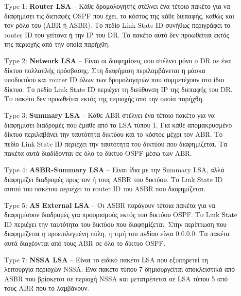 \documentclass{EdipyLabs} %
\begin{document}
\begin{itemize}
	\item [Type 1:] \textbf{Router LSA} -- Κάθε δρομολογητής στέλνει ένα τέτοιο πακέτο για να διαφημίσει τις διεπαφές OSPF που έχει, το κόστος της κάθε διεπαφής, καθώς και τον ρόλο του (ABR ή ASBR). Το πεδίο Link State ID συνήθως περιγράφει το router ID του γείτονα ή την IP του DR. Το πακέτο αυτό δεν προωθείται εκτός της περιοχής από την οποία παρήχθη.
	
	\item [Type 2:] \textbf{Network LSA} -- Είναι οι διαφημίσεις που στέλνει μόνο ο DR σε ένα δίκτυο πολλαπλής πρόσβασης. Στη διαφήμιση περιλαμβάνεται η μάσκα υποδικτύου και router ID όλων των δρομολογητών που συμμετέχουν στο ίδιο δίκτυο. Το πεδίο Link State ID περιέχει τη διεύθυνση IP της διεπαφής του DR. Το πακέτο δεν προωθείται εκτός της περιοχής από την οποία παρήχθη. 
	
	\item [Type 3:] \textbf{Summary LSA} -- Κάθε ABR στέλνει ένα τέτοιο πακέτο για να διαφημίσει διαδρομές που έμαθε από τα LSA τύπου 1. Για κάθε απομακρυσμένο δίκτυο περιλαβάνει την ταυτότητα δικτύου και το κόστος μέχρι τον ABR. Το πεδίο Link State ID περιέχει την ταυτότητα του δικτύου που διαφημίζεται. Τα πακέτα αυτά διαδίδονται σε όλο το δίκτυο OSPF μέσω των ABR. 
	
	\item [Type 4:] \textbf{ASBR-Summary LSA} -- Είναι ίδια με την Summary LSA, αλλά διαφημίζει διαδρομές προς τον ή τους ASBR του δικτύου. Το Link State ID αυτού του πακέτου περιέχει το router ID του ASBR που διαφημίζεται.
	
	\item [Type 5:] \textbf{AS External LSA} -- Οι ASBR παράγουν τέτοια πακέτα για να διαφημίσουν διαδρομές για προορισμούς εκτός του δικτύου OSPF. Το Link State ID περιέχει την ταυτότητα του δικτύου που διαφημίζεται. Στην περίπτωση που διαφημίζεται η προεπιλεγμένη πύλη, η τιμή του πεδίου είναι 0.0.0.0. Τα πακέτα αυτά διαχέονται από τους ABR σε όλο το δίκτυο OSPF. 
	
	\item [Type 7:] \textbf{NSSA LSA} -- Είναι το ειδικό πακέτο LSA που εξυπηρετεί τη λειτουργία περιοχών NSSA. Ένα πακέτο τύπου 7 δημιουργείται αποκλειστικά από ASBR που βρίσκεται σε περιοχή NSSA και μετατρέπεται σε LSA τύπου 5 από τους ABR που το λαμβάνουν.  
\end{itemize}

\end{document}
